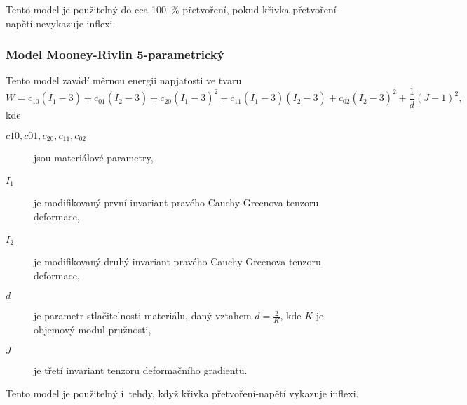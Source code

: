 Tento model je použitelný do cca \SI{100}{\percent} přetvoření, pokud křivka přetvoření-napětí nevykazuje inflexi.

\subsubsection{Model Mooney-Rivlin 5-parametrický}
Tento model zavádí měrnou energii napjatosti ve tvaru
\begin{equation}
	W
	= c_{10} \left(\bar{I}_1 - 3\right)
	+ c_{01} \left(\bar{I}_2 - 3\right)
	+ c_{20} \left(\bar{I}_1 - 3\right)^2
	+ c_{11} \left(\bar{I}_1 - 3\right) \left(\bar{I}_2 - 3\right)
	+ c_{02} \left(\bar{I}_2 - 3\right)^2
	+ \frac{1}{d} \left(J - 1\right)^2,
\end{equation}
kde
\begin{description}
	\item[$c10, c01, c_{20}, c_{11}, c_{02}$] jsou materiálové parametry,
	\item[$\bar{I}_1$] je modifikovaný první invariant pravého Cauchy-Greenova tenzoru deformace,
	\item[$\bar{I}_2$] je modifikovaný druhý invariant pravého Cauchy-Greenova tenzoru deformace,
	\item[$d$] je parametr stlačitelnosti materiálu, daný vztahem $d = \frac{2}{K}$, kde $K$ je objemový modul pružnosti,
	\item[$J$] je třetí invariant tenzoru deformačního gradientu.
\end{description}

Tento model je použitelný i~tehdy, když křivka přetvoření-napětí vykazuje inflexi.

